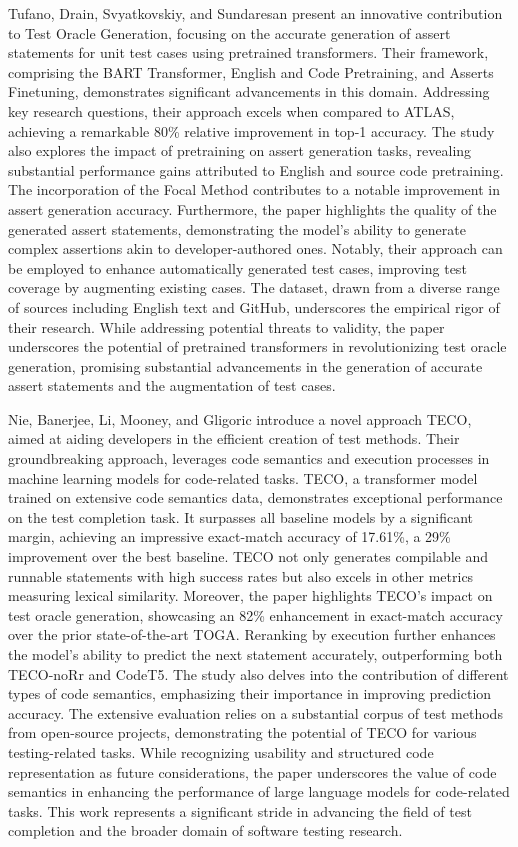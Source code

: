 Tufano, Drain, Svyatkovskiy, and Sundaresan present an innovative contribution\cite{tufano_generating_2022} to Test Oracle Generation, focusing on the accurate generation of assert statements for unit test cases using pretrained transformers. Their framework, comprising the BART Transformer, English and Code Pretraining, and Asserts Finetuning, demonstrates significant advancements in this domain. Addressing key research questions, their approach excels when compared to ATLAS, achieving a remarkable 80\% relative improvement in top-1 accuracy. The study also explores the impact of pretraining on assert generation tasks, revealing substantial performance gains attributed to English and source code pretraining. The incorporation of the Focal Method contributes to a notable improvement in assert generation accuracy. Furthermore, the paper highlights the quality of the generated assert statements, demonstrating the model's ability to generate complex assertions akin to developer-authored ones. Notably, their approach can be employed to enhance automatically generated test cases, improving test coverage by augmenting existing cases. The dataset, drawn from a diverse range of sources including English text and GitHub, underscores the empirical rigor of their research. While addressing potential threats to validity, the paper underscores the potential of pretrained transformers in revolutionizing test oracle generation, promising substantial advancements in the generation of accurate assert statements and the augmentation of test cases.

Nie, Banerjee, Li, Mooney, and Gligoric introduce a novel approach TECO\cite{nie_learning_2023}, aimed at aiding developers in the efficient creation of test methods. Their groundbreaking approach, leverages code semantics and execution processes in machine learning models for code-related tasks. TECO, a transformer model trained on extensive code semantics data, demonstrates exceptional performance on the test completion task. It surpasses all baseline models by a significant margin, achieving an impressive exact-match accuracy of 17.61\%, a 29\% improvement over the best baseline. TECO not only generates compilable and runnable statements with high success rates but also excels in other metrics measuring lexical similarity. Moreover, the paper highlights TECO's impact on test oracle generation, showcasing an 82\% enhancement in exact-match accuracy over the prior state-of-the-art TOGA. Reranking by execution further enhances the model's ability to predict the next statement accurately, outperforming both TECO-noRr and CodeT5. The study also delves into the contribution of different types of code semantics, emphasizing their importance in improving prediction accuracy. The extensive evaluation relies on a substantial corpus of test methods from open-source projects, demonstrating the potential of TECO for various testing-related tasks. While recognizing usability and structured code representation as future considerations, the paper underscores the value of code semantics in enhancing the performance of large language models for code-related tasks. This work represents a significant stride in advancing the field of test completion and the broader domain of software testing research.


